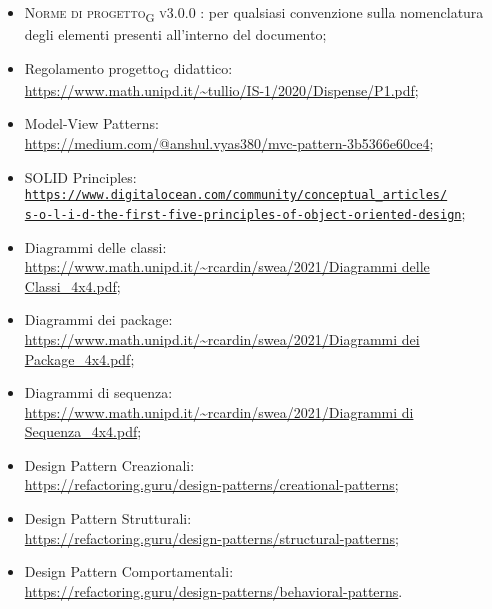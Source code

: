 \begin{itemize}
	\item \textsc{Norme di progetto\textsubscript{G} v3.0.0 }: per qualsiasi convenzione sulla nomenclatura degli elementi presenti all’interno del documento;

	\item Regolamento progetto\textsubscript{G} didattico: \\ {\url{https://www.math.unipd.it/~tullio/IS-1/2020/Dispense/P1.pdf}};
	\item Model-View Patterns: \\ {\url{https://medium.com/@anshul.vyas380/mvc-pattern-3b5366e60ce4}};
    \item SOLID Principles: \\ \href{https://www.digitalocean.com/community/conceptual\_articles/s-o-l-i-d-the-first-five-principles-of-object-oriented-design}{\texttt{https://www.digitalocean.com/community/conceptual\_articles/}\\ \texttt{s-o-l-i-d-the-first-five-principles-of-object-oriented-design}};
	\item Diagrammi delle classi: \\ {\url{https://www.math.unipd.it/~rcardin/swea/2021/Diagrammi delle Classi_4x4.pdf}};
	\item Diagrammi dei package: \\ {\url{https://www.math.unipd.it/~rcardin/swea/2021/Diagrammi dei Package_4x4.pdf}};
	\item Diagrammi di sequenza: \\ {\url{https://www.math.unipd.it/~rcardin/swea/2021/Diagrammi di Sequenza_4x4.pdf}};
	\item Design Pattern Creazionali: \\ {\url{https://refactoring.guru/design-patterns/creational-patterns}};
	\item Design Pattern Strutturali: \\ {\url{https://refactoring.guru/design-patterns/structural-patterns}};
	\item Design Pattern Comportamentali: \\ {\url{https://refactoring.guru/design-patterns/behavioral-patterns}}.
\end{itemize}



